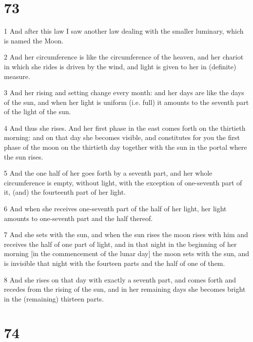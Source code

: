 \chapter{73}

\par 1 And after this law I saw another law dealing with the smaller luminary, which is named the Moon.
\par 2 And her circumference is like the circumference of the heaven, and her chariot in which she rides is driven by the wind, and light is given to her in (definite) measure.
\par 3 And her rising and setting change every month: and her days are like the days of the sun, and when her light is uniform (i.e. full) it amounts to the seventh part of the light of the sun.
\par 4 And thus she rises. And her first phase in the east comes forth on the thirtieth morning: and on that day she becomes visible, and constitutes for you the first phase of the moon on the thirtieth day together with the sun in the portal where the sun rises.
\par 5 And the one half of her goes forth by a seventh part, and her whole circumference is empty, without light, with the exception of one-seventh part of it, (and) the fourteenth part of her light.
\par 6 And when she receives one-seventh part of the half of her light, her light amounts to one-seventh part and the half thereof.
\par 7 And she sets with the sun, and when the sun rises the moon rises with him and receives the half of one part of light, and in that night in the beginning of her morning [in the commencement of the lunar day] the moon sets with the sun, and is invisible that night with the fourteen parts and the half of one of them.
\par 8 And she rises on that day with exactly a seventh part, and comes forth and recedes from the rising of the sun, and in her remaining days she becomes bright in the (remaining) thirteen parts.

\chapter{74}

